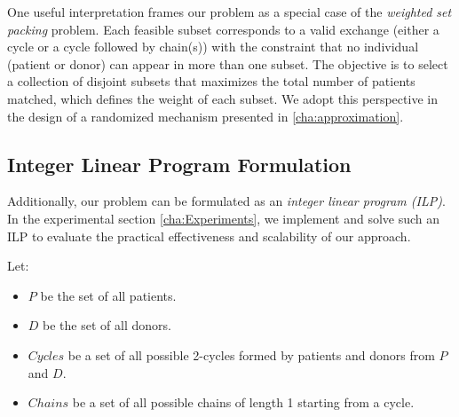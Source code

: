 \label{pro:weighted_set_packing}

One useful interpretation frames our problem as a special case of the \emph{weighted set packing} problem. Each feasible subset corresponds to a valid exchange (either a cycle or a cycle followed by chain(s)) with the constraint that no individual (patient or donor) can appear in more than one subset. The objective is to select a collection of disjoint subsets that maximizes the total number of patients matched, which defines the weight of each subset. We adopt this perspective in the design of a randomized mechanism presented in \autoref{cha:approximation}.




\subsection{Integer Linear Program Formulation}
Additionally, our problem can be formulated as an \emph{integer linear program (ILP)}. In the experimental section \autoref{cha:Experiments}, we implement and solve such an ILP to evaluate the practical effectiveness and scalability of our approach.


Let:
\begin{itemize}
    \item $P$ be the set of all patients.
    \item $D$ be the set of all donors.
    \item $Cycles$ be a set of all possible 2-cycles formed by patients and donors from $P$ and $D$.
    \item $Chains$ be a set of all possible chains of length 1 starting from a cycle.
\end{itemize}

